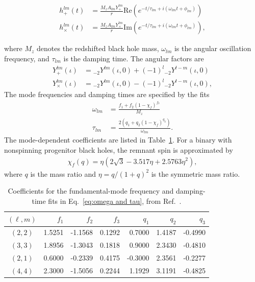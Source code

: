 \documentclass[prd,aps,a4paper,twocolumn,superscriptaddress,nofootinbib,floatfix]{revtex4-2}
\begin{document}
\begin{align}
h_{+}^{lm}(t)&=\frac{M_z A_{lm}Y_{+}^{lm}}{r}\mathrm{Re} (e^{-t/\tau_{lm}+i(\omega_{lm}t+\phi_{lm})})\\
h_{\times}^{lm}(t)&=\frac{M_z A_{lm}Y_{\times}^{lm}}{r}\mathrm{Im} (e^{-t/\tau_{lm}+i(\omega_{lm}t+\phi_{lm})}),
\label{eq:ringdown}
\end{align}

where $M_z$ denotes the redshifted black hole mass, $\omega_{lm}$ is the angular oscillation frequency, and $\tau_{lm}$ is the damping time. The angular factors are
\begin{align}
Y_{+}^{lm}(\iota)&={}_{-2}Y^{lm}(\iota,0)+(-1)^l {}_{-2}Y^{l -m}(\iota,0)\\
Y_{\times}^{lm}(\iota)&={}_{-2}Y^{lm}(\iota,0)-(-1)^l {}_{-2}Y^{l -m}(\iota,0),
\label{eq:angular function}
\end{align}
The mode frequencies and damping times are specified by the fits~\cite{Berti_2016}
\begin{align}
\omega_{lm}&=\frac{f_1+f_2(1-\chi_f)^{f_3}}{M_z}\\
\tau_{lm}&=\frac{2(q_1+q_2(1-\chi_f)^{q_3})}{\omega_{lm}}.
\label{eq:omega and tau}
\end{align}
The mode-dependent coefficients are listed in Table~\ref{fitting para}. For a binary with nonspinning progenitor black holes, the remnant spin is approximated by~\cite{Barausse_2009}
\begin{align}
    \chi_f(q)=\eta(2\sqrt{3}-3.517\eta+2.5763\eta^2),
\label{eq:angular momentum}
\end{align}
where $q$ is the mass ratio and $\eta=q/(1+q)^2$ is the symmetric mass ratio.

\begin{table}[t]

  \caption{Coefficients for the fundamental-mode frequency and damping-time fits in Eq.~\eqref{eq:omega and tau}, from Ref.~\cite{Berti_2006}.}
  \label{tab:fit-coeff}
  \begin{ruledtabular}
    \begin{tabular}{crrrrrr}
      $(\ell,m)$ & $f_1$   & $f_2$    & $f_3$   & $q_1$   & $q_2$   & $q_3$   \\
      \hline
      $(2,2)$    & 1.5251  & -1.1568  & 0.1292  & 0.7000  & 1.4187  & -0.4990 \\
      $(3,3)$    & 1.8956  & -1.3043  & 0.1818  & 0.9000  & 2.3430  & -0.4810 \\
      $(2,1)$    & 0.6000  & -0.2339  & 0.4175  & -0.3000 & 2.3561  & -0.2277 \\
      $(4,4)$    & 2.3000  & -1.5056  & 0.2244  & 1.1929  & 3.1191  & -0.4825 \\
    \end{tabular}
  \end{ruledtabular}
 \label{fitting para}
\end{table}
\end{document}
